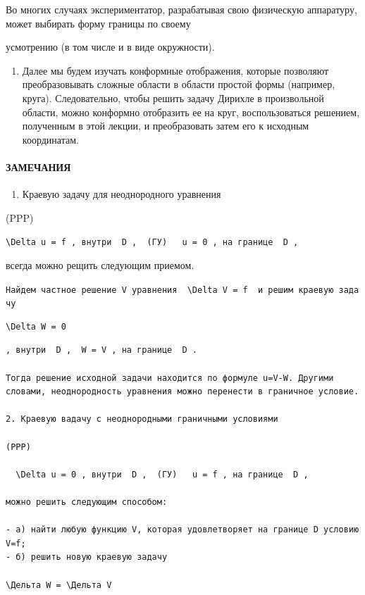 \documentclass[
  ukrainian,
]{article}
\providecommand{\tightlist}{%
  \setlength{\itemsep}{0pt}\setlength{\parskip}{0pt}}
\begin{document}
Во многих случаях экспериментатор, разрабатывая свою физическую
аппаратуру, может выбирать форму границы по своему

усмотрению (в том числе и в виде окружности).

\begin{enumerate}
\def\labelenumi{\arabic{enumi}.}
\setcounter{enumi}{1}
\tightlist
\item
  Далее мы будем изучать конформные отображения, которые позволяют
  преобразовывать сложные области в области простой формы (например,
  круга). Следовательно, чтобы решить задачу Дирихле в произвольной
  области, можно конформно отобразить ее на круг, воспользоваться
  решением, полученным в этой лекции, и преобразовать затем его к
  исходным координатам.
\end{enumerate}

\paragraph{ЗАМЕЧАНИЯ}\label{ux437ux430ux43cux435ux447ux430ux43dux438ux44f-4}

\begin{enumerate}
\def\labelenumi{\arabic{enumi}.}
\tightlist
\item
  Краевую задачу для неоднородного уравнения
\end{enumerate}

(PPP)

\texttt{\textquotesingle{}\textbackslash{}Delta\ u\ =\ f\textquotesingle{}\ ,\ внутри\ \ \textquotesingle{}D\textquotesingle{}\ ,\ \ \textquotesingle{}(ГУ)\textquotesingle{}\ \ \ \textquotesingle{}u\ =\ 0\textquotesingle{}\ ,\ на\ границе\ \ \textquotesingle{}D\textquotesingle{}\ ,}

всегда можно рещить следующим приемом.

\texttt{Найдем\ частное\ решение\ V\ уравнения\ \ \textquotesingle{}\textbackslash{}Delta\ V\ =\ f\textquotesingle{}\ \ и\ решим\ краевую\ задачу}

\begin{verbatim}
\Delta W = 0
\end{verbatim}

\begin{verbatim}
, внутри  D ,  W = V , на границе  D .

Тогда решение исходной задачи находится по формуле u=V-W. Другими словами, неоднородность уравнения можно перенести в граничное условие.

2. Краевую вадачу с неоднородными граничными условиями

(PPP)

  \Delta u = 0 , внутри  D ,  (ГУ)   u = f , на границе  D ,

можно решить следующим способом:

- а) найти любую функцию V, которая удовлетворяет на границе D условию V=f;
- б) решить новую краевую задачу

\Дельта W = \Дельта V
\end{verbatim}
\end{document}
